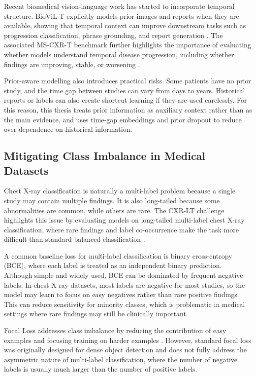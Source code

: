 Recent biomedical vision-language work has started to incorporate temporal structure. BioViL-T explicitly models prior images and reports when they are available, showing that temporal context can improve downstream tasks such as progression classification, phrase grounding, and report generation \cite{bannur2023biovilt}. The associated MS-CXR-T benchmark further highlights the importance of evaluating whether models understand temporal disease progression, including whether findings are improving, stable, or worsening \cite{bannur2023biovilt}.

Prior-aware modelling also introduces practical risks. Some patients have no prior study, and the time gap between studies can vary from days to years. Historical reports or labels can also create shortcut learning if they are used carelessly. For this reason, this thesis treats prior information as auxiliary context rather than as the main evidence, and uses time-gap embeddings and prior dropout to reduce over-dependence on historical information.

\subsection{Mitigating Class Imbalance in Medical Datasets}
\label{subsec:related_class_imbalance}

Chest X-ray classification is naturally a multi-label problem because a single study may contain multiple findings. It is also long-tailed because some abnormalities are common, while others are rare. The CXR-LT challenge highlights this issue by evaluating models on long-tailed multi-label chest X-ray classification, where rare findings and label co-occurrence make the task more difficult than standard balanced classification \cite{holste2024cxrlt,holste2025cxrlt2024}.

A common baseline loss for multi-label classification is binary cross-entropy (BCE), where each label is treated as an independent binary prediction. Although simple and widely used, BCE can be dominated by frequent negative labels. In chest X-ray datasets, most labels are negative for most studies, so the model may learn to focus on easy negatives rather than rare positive findings. This can reduce sensitivity for minority classes, which is problematic in medical settings where rare findings may still be clinically important.

Focal Loss addresses class imbalance by reducing the contribution of easy examples and focusing training on harder examples \cite{lin2017focalloss}. However, standard focal loss was originally designed for dense object detection and does not fully address the asymmetric nature of multi-label classification, where the number of negative labels is usually much larger than the number of positive labels.

